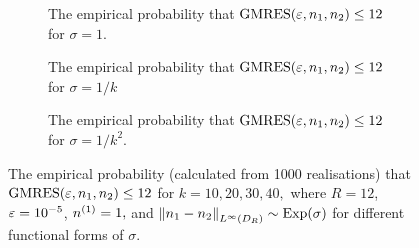 


\begin{figure}[p]
  \centering
  \begin{subfigure}{\textwidth}
    \centering

\caption{The empirical probability that $\GMRES{\eps}{\no}{\nt}\leq 12$ for $\sigma = 1.$\label{fig:prob-plot-0.0}}
\end{subfigure}

\begin{subfigure}{\textwidth}
    \centering

\caption{The empirical probability that $\GMRES{\eps}{\no}{\nt}\leq 12$ for $\sigma = 1/k$\label{fig:prob-plot-1.0}}
\end{subfigure}

\begin{subfigure}{\textwidth}
    \centering

\caption{The empirical probability that $\GMRES{\eps}{\no}{\nt}\leq 12$ for $\sigma = 1/k^2.$\label{fig:prob-plot-2.0}}
\end{subfigure}
\caption[The empirical probability that GMRES applied to a nearby-preconditioned linear system converges in at most 12 iterations.]{The empirical probability (calculated from 1000 realisations) that $\GMRES{\eps}{\no}{\nt}\leq 12$ for $k = 10, 20, 30, 40,$ where $R=12$, $\varepsilon = 10^{-5}$, ${n}^{(1)}=1,$ and $\NLiDR{\no-\nt} \sim \Exp{\sigma}$ for different functional forms of $\sigma.$}
\end{figure}
